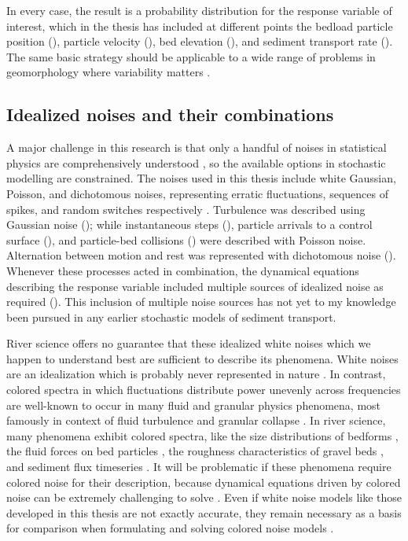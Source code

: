 In every case, the result is a probability distribution for the response variable of interest, which in the thesis has included at different points the bedload particle position (), particle velocity (), bed elevation (), and sediment transport rate ().
The same basic strategy should be applicable to a wide range of problems in geomorphology where variability matters \citep{Furbish2021a}.

\subsection{Idealized noises and their combinations}

A major challenge in this research is that only a handful of noises in statistical physics are comprehensively understood \citep{Horsthemke1984}, so the available options in stochastic modelling are constrained.
The noises used in this thesis include white Gaussian, Poisson, and dichotomous noises, representing erratic fluctuations, sequences of spikes, and random switches respectively \citep{VanDenBroeck1983}.
Turbulence was described using Gaussian noise (); while instantaneous steps (), particle arrivals to a control surface (), and particle-bed collisions () were described with Poisson noise. Alternation between motion and rest was represented with dichotomous noise ().
Whenever these processes acted in combination, the dynamical equations describing the response variable included multiple sources of idealized noise as required ().
This inclusion of multiple noise sources has not yet to my knowledge been pursued in any earlier stochastic models of sediment transport.

River science offers no guarantee that these idealized white noises which we happen to understand best are sufficient to describe its phenomena.
White noises are an idealization which is probably never represented in nature \citep{Gardiner1983,Kubo1978}.
In contrast, colored spectra in which fluctuations distribute power unevenly across frequencies are well-known to occur in many fluid and granular physics phenomena, most famously in context of fluid turbulence \citep{Kolmogorov1941,Nikora2000} and granular collapse \citep{Bak1987,Jensen1998}.
In river science, many phenomena exhibit colored spectra, like the size distributions of bedforms \citep{Nikora1997,Guala2014}, the fluid forces on bed particles \citep{Dwivedi2011, Amir2014}, the roughness characteristics of gravel beds \citep{Aberle2006,Singh2012}, and sediment flux timeseries \citep{Dhont2018,Chartrand2021}.
It will be problematic if these phenomena require colored noise for their description, because dynamical equations driven by colored noise can be extremely challenging to solve \citep{Hanggi1978,Luczka2005,Hanggi2007}. Even if white noise models like those developed in this thesis are not exactly accurate, they remain necessary as a basis for comparison when formulating and solving colored noise models \citep{Fox1986,Moss1989}.

